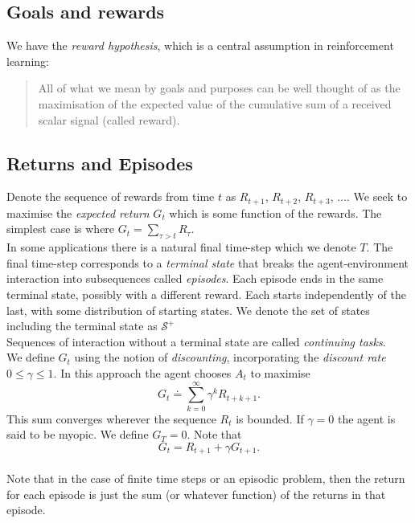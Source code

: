 \subsection{Goals and rewards}
We have the \emph{reward hypothesis}, which is a central assumption in reinforcement learning:
\begin{quote}
    All of what we mean by goals and purposes can be well thought of as the maximisation of the expected value of the cumulative sum of a received scalar signal (called reward).
\end{quote}


\subsection{Returns and Episodes}
Denote the sequence of rewards from time $t$ as $R_{t+1}$, $R_{t+2}$, $R_{t+3}$, $\dots$. We seek to maximise the \emph{expected return} $G_t$ which is some function of the rewards. The simplest case is where $G_t = \sum_{\tau > t} R_\tau$.\\

In some applications there is a natural final time-step which we denote $T$. The final time-step corresponds to a \emph{terminal state} that breaks the agent-environment interaction into subsequences called \emph{episodes}. Each episode ends in the same terminal state, possibly with a different reward. Each starts independently of the last, with some distribution of starting states. We denote the set of states including the terminal state as $\mathcal{S}^+$\\

Sequences of interaction without a terminal state are called \emph{continuing tasks}. \\

We define $G_t$ using the notion of \emph{discounting}, incorporating the \emph{discount rate} $0 \leq \gamma \leq 1$. In this approach the agent chooses $A_t$ to maximise 
\begin{equation}
    G_t \doteq \sum_{k = 0}^{\infty} \gamma^k R_{t+k+1}.
\end{equation}
 This sum converges wherever the sequence $R_t$ is bounded. If $\gamma = 0$ the agent is said to be myopic. We define $G_T = 0$. Note that
\begin{equation}
     G_t = R_{t+1} + \gamma G_{t+1}.
\end{equation}\\

Note that in the case of finite time steps or an episodic problem, then the return for each episode is just the sum (or whatever function) of the returns in that episode.


